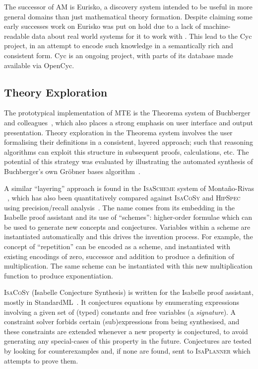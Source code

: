 The successor of AM is Eurisko, a discovery system intended to be useful in more
general domains than just mathematical theory formation. Despite claiming some
early successes %
work on Eurisko was put on hold due to a lack of machine-readable data about
real world systems for it to work with %
. This lead to the Cyc project, in an attempt to encode such knowledge in a
semantically rich and consistent form. Cyc is an ongoing project, with parts of
its database made available via OpenCyc.

\subsection{Theory Exploration}

The prototypical implementation of MTE is the Theorema system of Buchberger and
colleagues~\cite{buchberger,buchberger2016theorema}, which also places a strong
emphasis on user interface and output presentation. Theory exploration in the
Theorema system involves the user formalising their definitions in a consistent,
layered approach; such that reasoning algorithms can exploit this structure in
subsequent proofs, calculations, etc. The potential of this strategy was
evaluated by illustrating the automated synthesis of Buchberger's own Gr\"obner
bases algorithm~\cite{buchberger:04}.

A similar ``layering'' approach is found in the \textsc{IsaScheme} system of
Monta{\~n}o-Rivas \etal{}~\cite{Montano-Rivas.McCasland.Dixon.ea:2012}, which
has also been quantitatively compared against \textsc{IsaCoSy} and
\textsc{HipSpec} using precision/recall analysis~\cite{claessen2013automating}.
The name comes from its embedding in the Isabelle proof assistant and its use of
``schemes'': higher-order formulae which can be used to generate new concepts
and conjectures. Variables within a scheme are instantiated automatically and
this drives the invention process. For example, the concept of ``repetition''
can be encoded as a scheme, and instantiated with existing encodings of zero,
successor and addition to produce a definition of multiplication. The same
scheme can be instantiated with this new multiplication function to produce
exponentiation.

\textsc{IsaCoSy} (Isabelle Conjecture Synthesis) is written for the Isabelle
proof assistant, mostly in
StandardML~\cite{Johansson.Dixon.Bundy:conjecture-generation}. It conjectures
equations by enumerating expressions involving a given set of (typed) constants
and free variables (a \emph{signature}). A constraint solver forbids certain
(sub)expressions from being synthesised, and these constraints are extended
whenever a new property is conjectured, to avoid generating any special-cases of
this property in the future. Conjectures are tested by looking for
counterexamples and, if none are found, sent to \textsc{IsaPlanner} which
attempts to prove them.

